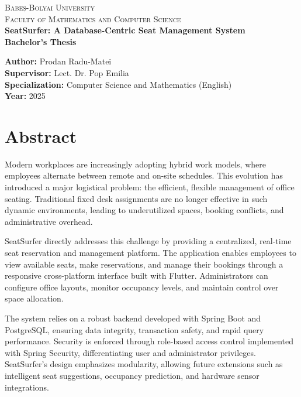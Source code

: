 \documentclass[12pt,a4paper]{report} %
\begin{document}
\begin{titlepage}
    \centering
    \textsc{\LARGE Babeș-Bolyai University}\\[0.5cm]
    \textsc{\Large Faculty of Mathematics and Computer Science}\\[1.5cm]
    {\huge\bfseries SeatSurfer: A Database-Centric Seat Management System\\[0.4cm]}
    \vspace{1.5cm}
    \Large
    \textbf{Bachelor's Thesis}\\[0.5cm]
    \begin{flushleft}
        \textbf{Author:} Prodan Radu-Matei\\
        \textbf{Supervisor:} Lect. Dr. Pop Emilia \\
        \textbf{Specialization:} Computer Science and Mathematics (English) \\
        \textbf{Year:} 2025
    \end{flushleft}
    \vfill
\end{titlepage}

\chapter*{Abstract}

Modern workplaces are increasingly adopting hybrid work models, where employees alternate between remote and on-site schedules. This evolution has introduced a major logistical problem: the efficient, flexible management of office seating. Traditional fixed desk assignments are no longer effective in such dynamic environments, leading to underutilized spaces, booking conflicts, and administrative overhead.

SeatSurfer directly addresses this challenge by providing a centralized, real-time seat reservation and management platform. The application enables employees to view available seats, make reservations, and manage their bookings through a responsive cross-platform interface built with Flutter. Administrators can configure office layouts, monitor occupancy levels, and maintain control over space allocation.

The system relies on a robust backend developed with Spring Boot and PostgreSQL, ensuring data integrity, transaction safety, and rapid query performance. Security is enforced through role-based access control implemented with Spring Security, differentiating user and administrator privileges. SeatSurfer's design emphasizes modularity, allowing future extensions such as intelligent seat suggestions, occupancy prediction, and hardware sensor integrations.
\end{document}
